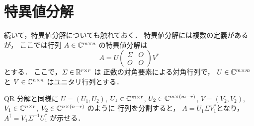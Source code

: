 \section{特異値分解}

続いて，特異値分解についても触れておく．
特異値分解には複数の定義があるが，
ここでは行列 $A \in \mathbb{C}^{m \times n}$ の特異値分解は
\begin{equation}
    A = U
    \begin{pmatrix}
        \Sigma & O \\
        O      & O
    \end{pmatrix}
    V^*
\end{equation}
とする．
ここで，$\varSigma \in \mathbb{R}^{r \times r}$ は
正数の対角要素による対角行列で，
$U \in \mathbb{C}^{m \times m}$ と
$V \in \mathbb{C}^{n \times n}$ はユニタリ行列とする．

QR 分解と同様に
$U = (U_1, U_2)$,
$U_1 \in \mathbb{C}^{m \times r}$,
$U_2 \in \mathbb{C}^{m \times (m-r)}$,
$V = (V_2, V_2)$,
$V_1 \in \mathbb{C}^{n \times r}$,
$V_2 \in \mathbb{C}^{n \times (n-r)}$ のように
行列を分割すると，
$A = U_1 \Sigma V_1^*$となり，
$A^\dagger = V_1 \Sigma^{-1} U_1^*$ が示せる．
